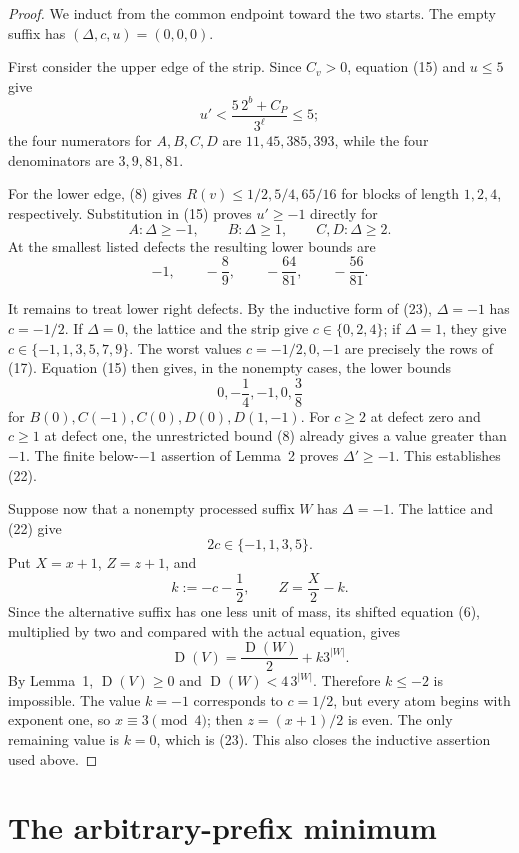 \documentclass[11pt]{article}
\newcommand{\sh}{\operatorname{D}}
\begin{document}
\begin{proof}
We induct from the common endpoint toward the two starts.  The empty
suffix has $(\Delta,c,u)=(0,0,0)$.

First consider the upper edge of the strip.  Since $C_v>0$, equation
(15) and $u\leq5$ give
\[
 u'<\frac{5\,2^b+C_P}{3^\ell}\leq5;
 \tag{24}
\]
the four numerators for $A,B,C,D$ are $11,45,385,393$, while the four
denominators are $3,9,81,81$.

For the lower edge, (8) gives $R(v)\leq1/2,5/4,65/16$ for blocks of
length $1,2,4$, respectively.  Substitution in (15) proves $u'\geq-1$
directly for
\[
 A:\Delta\geq-1,
 \qquad B:\Delta\geq1,
 \qquad C,D:\Delta\geq2.
 \tag{25}
\]
At the smallest listed defects the resulting lower bounds are
\[
 -1,\qquad -\frac89,\qquad -\frac{64}{81},\qquad -\frac{56}{81}.
\]

\newpage
It remains to treat lower right defects.  By the inductive form of (23),
$\Delta=-1$ has $c=-1/2$.  If $\Delta=0$, the lattice and the strip give
$c\in\{0,2,4\}$; if $\Delta=1$, they give
$c\in\{-1,1,3,5,7,9\}$.  The worst values $c=-1/2,0,-1$ are precisely
the rows of (17).  Equation (15) then gives, in the nonempty cases, the
lower bounds
\[
 0,-\frac14,-1,0,\frac38
 \tag{26}
\]
for $B(0),C(-1),C(0),D(0),D(1,-1)$.
For $c\geq2$ at defect zero and $c\geq1$ at defect one, the unrestricted
bound (8) already gives a value greater than $-1$.  The finite
below-$-1$ assertion of Lemma~2 proves $\Delta'\geq-1$.  This establishes
(22).

Suppose now that a nonempty processed suffix $W$ has $\Delta=-1$.
The lattice and (22) give
\[
 2c\in\{-1,1,3,5\}.
 \tag{27}
\]
Put $X=x+1$, $Z=z+1$, and
\[
 k:=-c-\frac12,
 \qquad Z=\frac{X}{2}-k.
 \tag{28}
\]
Since the alternative suffix has one less unit of mass, its shifted
equation (6), multiplied by two and compared with the actual equation,
gives
\[
 \sh(V)=\frac{\sh(W)}2+k3^{|W|}.
 \tag{29}
\]
By Lemma~1, $\sh(V)\geq0$ and $\sh(W)<4\,3^{|W|}$.  Therefore
$k\leq-2$ is impossible.  The value $k=-1$ corresponds to $c=1/2$,
but every atom begins with exponent one, so $x\equiv3\pmod4$; then
$z=(x+1)/2$ is even.  The only remaining value is $k=0$, which is (23).
This also closes the inductive assertion used above.
\end{proof}

\section{The arbitrary-prefix minimum}
\end{document}
